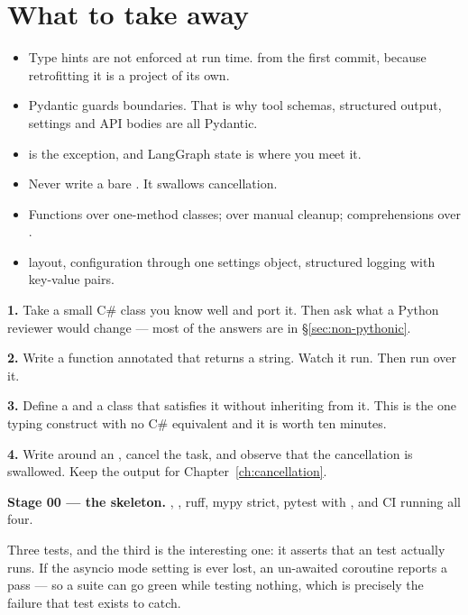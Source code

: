 \section{What to take away}
\label{sec:ch2-summary}

\begin{itemize}[leftmargin=1.4em]
\item Type hints are not enforced at run time.  from the
      first commit, because retrofitting it is a project of its own.
\item Pydantic guards boundaries. That is why tool schemas, structured output,
      settings and API bodies are all Pydantic.
\item {} is the exception, and LangGraph state is where you meet
      it.
\item Never write a bare . It swallows cancellation.
\item Functions over one-method classes;  over manual cleanup;
      comprehensions over .
\item {} layout, configuration through one settings object, structured
      logging with key-value pairs.
\end{itemize}

\begin{exercisebox}
\textbf{1.} Take a small C\# class you know well and port it. Then ask what a
Python reviewer would change --- most of the answers are in
\S\ref{sec:non-pythonic}.

\textbf{2.} Write a function annotated  that returns a string. Watch
it run. Then run  over it.

\textbf{3.} Define a  and a class that satisfies it without
inheriting from it. This is the one typing construct with no C\# equivalent and
it is worth ten minutes.

\textbf{4.} Write  around an , cancel the
task, and observe that the cancellation is swallowed. Keep the output for
Chapter~\ref{ch:cancellation}.
\end{exercisebox}

\begin{projectbox}
\textbf{Stage 00 --- the skeleton.} , , ruff, mypy
strict, pytest with , and CI running all four.

Three tests, and the third is the interesting one: it asserts that an
 test actually runs. If the asyncio mode setting is ever lost, an
un-awaited coroutine reports a pass --- so a suite can go green while testing
nothing, which is precisely the failure that test exists to catch.
\end{projectbox}
